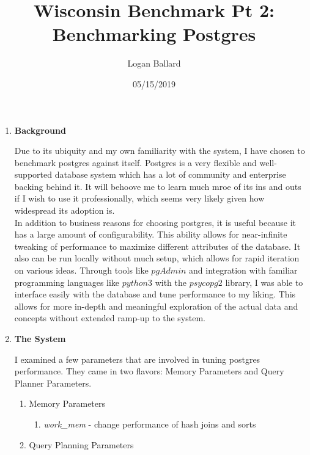 \documentclass[11pt,letterpaper]{article}
\author{Logan Ballard}
\title{Wisconsin Benchmark Pt 2: Benchmarking Postgres}
\date{05/15/2019}
\begin{document}
\maketitle

\begin{enumerate}
	
\item \textbf{Background}

Due to its ubiquity and my own familiarity with the system, I have chosen to benchmark postgres against itself.   Postgres is a very flexible and well-supported database system which has a lot of community and enterprise backing behind it.  It will behoove me to learn much mroe of its ins and outs if I wish to use it professionally, which seems very likely given how widespread its adoption is.\\

In addition to business reasons for choosing postgres, it is useful because it has a large amount of configurability.  This ability allows for near-infinite tweaking of performance to maximize different attributes of the database.  It also can be run locally without much setup, which allows for rapid iteration on various ideas.  Through tools like $pgAdmin$ and integration with familiar programming languages like $python3$ with the $psycopg2$ library, I was able to interface easily with the database and tune performance to my liking.  This allows for more in-depth and meaningful exploration of the actual data and concepts without extended ramp-up to the system.

\item \textbf{The System}

I examined a few parameters that are involved in tuning postgres performance.  They came in two flavors: Memory Parameters and Query Planner Parameters.

\begin{enumerate}{}
	\item Memory Parameters
	
	\begin{enumerate}
		\item \textit{work\_mem} - change performance of hash joins and sorts
	\end{enumerate}
	
	\item Query Planning Parameters
	

\end{enumerate}
\end{enumerate}
\end{document}
